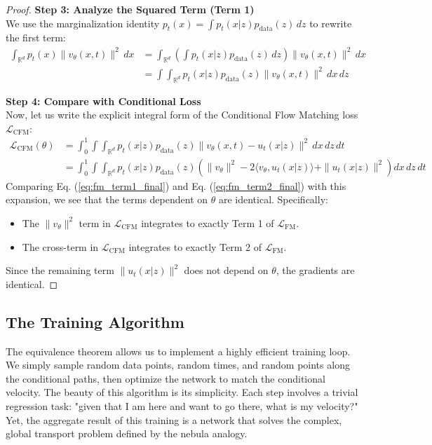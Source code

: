 \documentclass{book}
\begin{document}
\begin{proof}
\textbf{Step 3: Analyze the Squared Term (Term 1)} \\
We use the marginalization identity $p_t(x) = \int p_t(x|z) p_{\text{data}}(z) \, dz$ to rewrite the first term:
\begin{align}
\int_{\mathbb{R}^d} p_t(x) \| v_\theta(x, t) \|^2 \, dx &= \int_{\mathbb{R}^d} \left( \int p_t(x|z) p_{\text{data}}(z) \, dz \right) \| v_\theta(x, t) \|^2 \, dx \\
&= \int \int_{\mathbb{R}^d} p_t(x|z) p_{\text{data}}(z) \| v_\theta(x, t) \|^2 \, dx \, dz \label{eq:fm_term1_final}
\end{align}

\textbf{Step 4: Compare with Conditional Loss} \\
Now, let us write the explicit integral form of the Conditional Flow Matching loss $\mathcal{L}_{\text{CFM}}$:
\begin{align}
\mathcal{L}_{\text{CFM}}(\theta) &= \int_0^1 \int \int_{\mathbb{R}^d} p_t(x|z) p_{\text{data}}(z) \| v_\theta(x, t) - u_t(x|z) \|^2 \, dx \, dz \, dt \\
&= \int_0^1 \int \int_{\mathbb{R}^d} p_t(x|z) p_{\text{data}}(z) \left( \| v_\theta \|^2 - 2 \langle v_\theta, u_t(x|z) \rangle + \| u_t(x|z) \|^2 \right) dx \, dz \, dt
\end{align}
Comparing Eq. (\ref{eq:fm_term1_final}) and Eq. (\ref{eq:fm_term2_final}) with this expansion, we see that the terms dependent on $\theta$ are identical. Specifically:
\begin{itemize}
    \item The $\| v_\theta \|^2$ term in $\mathcal{L}_{\text{CFM}}$ integrates to exactly Term 1 of $\mathcal{L}_{\text{FM}}$.
    \item The cross-term in $\mathcal{L}_{\text{CFM}}$ integrates to exactly Term 2 of $\mathcal{L}_{\text{FM}}$.
\end{itemize}
Since the remaining term $\| u_t(x|z) \|^2$ does not depend on $\theta$, the gradients are identical.
\end{proof}

\subsection{The Training Algorithm}

The equivalence theorem allows us to implement a highly efficient training loop. We simply sample random data points, random times, and random points along the conditional paths, then optimize the network to match the conditional velocity. The beauty of this algorithm is its simplicity. Each step involves a trivial regression task: "given that I am here and want to go there, what is my velocity?" Yet, the aggregate result of this training is a network that solves the complex, global transport problem defined by the nebula analogy.
\end{document}
